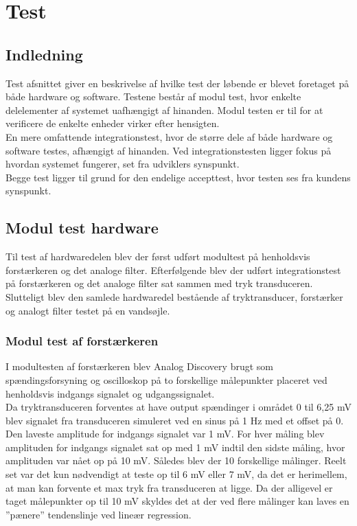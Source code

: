 \chapter{Test}\label{Test}
\setcounter{secnumdepth}{5}

\section{Indledning} 
Test afsnittet giver en beskrivelse af hvilke test der løbende er blevet foretaget på både hardware og software. Testene består af modul test, hvor enkelte delelementer af systemet uafhængigt af hinanden. Modul testen er til for at verificere de enkelte enheder virker efter hensigten.\\
En mere omfattende integrationstest, hvor de større dele af både hardware og software testes, afhængigt af hinanden. Ved integrationstesten ligger fokus på hvordan systemet fungerer, set fra udviklers synspunkt.\\ Begge test ligger til grund for den endelige accepttest, hvor testen ses fra kundens synspunkt.

\section{Modul test hardware}\label{ModulHard}

Til test af hardwaredelen blev der først udført modultest på henholdsvis forstærkeren og det analoge filter. Efterfølgende blev der udført integrationstest på forstærkeren og det analoge filter sat sammen med tryk transduceren. Slutteligt blev den samlede hardwaredel bestående af tryktransducer, forstærker og analogt filter testet på en vandsøjle.

\subsection{Modul test af forstærkeren}
I modultesten af forstærkeren blev Analog Discovery brugt som spændingsforsyning og oscilloskop på to forskellige målepunkter placeret ved henholdsvis indgangs signalet og udgangssignalet.\\
Da tryktransduceren forventes at have output spændinger i området 0 til 6,25 mV blev signalet fra transduceren simuleret ved en sinus på 1 Hz med et offset på 0. Den laveste amplitude for indgangs signalet var 1 mV. For hver måling blev amplituden for indgangs signalet sat op med 1 mV indtil den sidste måling, hvor amplituden var nået op på 10 mV. Således blev der 10 forskellige målinger. Reelt set var det kun nødvendigt at teste op til 6 mV eller 7 mV, da det er herimellem, at man kan forvente et max tryk fra transduceren at ligge. Da der alligevel er taget målepunkter op til 10 mV skyldes det at der ved flere målinger kan laves en ”pænere” tendenslinje ved lineær regression.

